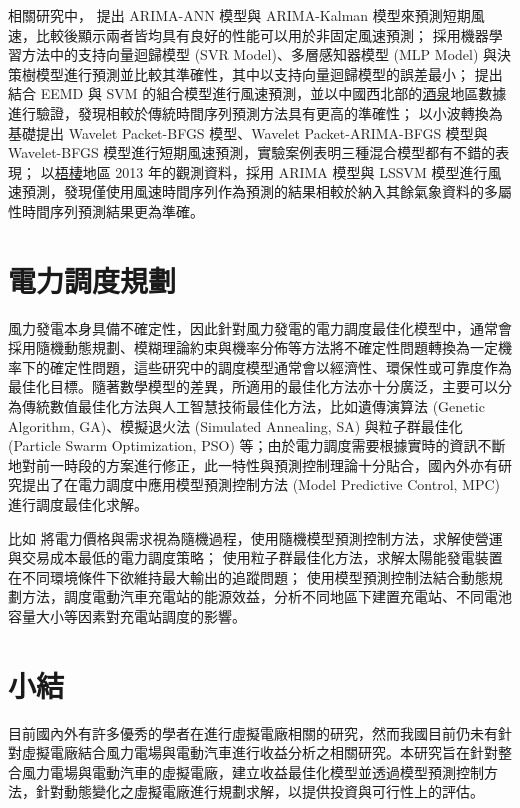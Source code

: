 相關研究中，\cite{liu2012comparison} 提出 ARIMA-ANN 模型與 ARIMA-Kalman 模型來預測短期風速，比較後顯示兩者皆均具有良好的性能可以用於非固定風速預測；\cite{kusiak2009short} 採用機器學習方法中的支持向量迴歸模型 (SVR Model)、多層感知器模型 (MLP Model) 與決策樹模型進行預測並比較其準確性，其中以支持向量迴歸模型的誤差最小；\cite{hu2013hybrid} 提出結合 EEMD 與 SVM 的組合模型進行風速預測，並以中國西北部的\uline{酒泉}地區數據進行驗證，發現相較於傳統時間序列預測方法具有更高的準確性；\cite{liu2013forecasting} 以小波轉換為基礎提出 Wavelet Packet-BFGS 模型、Wavelet Packet-ARIMA-BFGS
模型與 Wavelet-BFGS 模型進行短期風速預測，實驗案例表明三種混合模型都有不錯的表現；\cite{ting2015windpredict} 以\uline{梧棲}地區 2013 年的觀測資料，採用 ARIMA 模型與 LSSVM 模型進行風速預測，發現僅使用風速時間序列作為預測的結果相較於納入其餘氣象資料的多屬性時間序列預測結果更為準確。

\section{電力調度規劃}

風力發電本身具備不確定性，因此針對風力發電的電力調度最佳化模型中，通常會採用隨機動態規劃、模糊理論約束與機率分佈等方法將不確定性問題轉換為一定機率下的確定性問題，這些研究中的調度模型通常會以經濟性、環保性或可靠度作為最佳化目標。隨著數學模型的差異，所適用的最佳化方法亦十分廣泛，主要可以分為傳統數值最佳化方法與人工智慧技術最佳化方法，比如遺傳演算法 (Genetic Algorithm, GA)、模擬退火法 (Simulated Annealing, SA) 與粒子群最佳化 (Particle Swarm Optimization, PSO) 等；由於電力調度需要根據實時的資訊不斷地對前一時段的方案進行修正，此一特性與預測控制理論十分貼合，國內外亦有研究提出了在電力調度中應用模型預測控制方法 (Model Predictive Control, MPC) 進行調度最佳化求解。

比如 \cite{2011patrinos} 將電力價格與需求視為隨機過程，使用隨機模型預測控制方法，求解使營運與交易成本最低的電力調度策略；\cite{2015renaudineau} 使用粒子群最佳化方法，求解太陽能發電裝置在不同環境條件下欲維持最大輸出的追蹤問題；\cite{zhang2014application} 使用模型預測控制法結合動態規劃方法，調度電動汽車充電站的能源效益，分析不同地區下建置充電站、不同電池容量大小等因素對充電站調度的影響。

\section{小結}

目前國內外有許多優秀的學者在進行虛擬電廠相關的研究，然而我國目前仍未有針對虛擬電廠結合風力電場與電動汽車進行收益分析之相關研究。本研究旨在針對整合風力電場與電動汽車的虛擬電廠，建立收益最佳化模型並透過模型預測控制方法，針對動態變化之虛擬電廠進行規劃求解，以提供投資與可行性上的評估。
